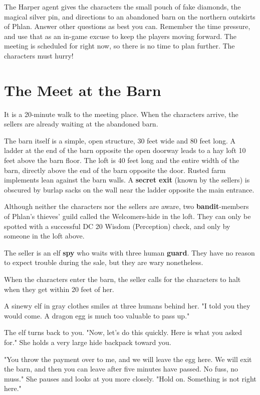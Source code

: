 \documentclass[10pt,a4paper,twoside,bg=print,twocolumn,openany,nodeprecatedcode]{dndbook}
\begin{document}
The Harper agent gives the characters the small pouch of fake diamonds, the magical silver pin, and directions to an abandoned barn on the northern outskirts of Phlan. Answer other questions as best you can. Remember the time pressure, and use that as an in-game excuse to keep the players moving forward. The meeting is scheduled for right now, so there is no time to plan further. The characters must hurry!

\section{The Meet at the Barn}
It is a 20-minute walk to the meeting place. When the characters arrive, the sellers are already waiting at the abandoned barn.

The barn itself is a simple, open structure, 30 feet wide and 80 feet long. A ladder at the end of the barn opposite the open doorway leads to a hay loft 10 feet above the barn floor. The loft is 40 feet long and the entire width of the barn, directly above the end of the barn opposite the door. Rusted farm implements lean against the barn walls. A \textbf{secret exit} (known by the sellers) is obscured by burlap sacks on the wall near the ladder opposite the main entrance.

Although neither the characters nor the sellers are aware, two \textbf{bandit}-members of Phlan's thieves' guild called the Welcomers-hide in the loft. They can only be spotted with a successful DC 20 Wisdom (Perception) check, and only by someone in the loft above.

The seller is an elf \textbf{spy} who waits with three human \textbf{guard}. They have no reason to expect trouble during the sale, but they are wary nonetheless.

When the characters enter the barn, the seller calls for the characters to halt when they get within 20 feet of her.

\begin{DndReadAloud}{}
A sinewy elf in gray clothes smiles at three humans behind her. "I told you they would come. A dragon egg is much too valuable to pass up."

The elf turns back to you. "Now, let's do this quickly. Here is what you asked for." She holds a very large hide backpack toward you.

"You throw the payment over to me, and we will leave the egg here. We will exit the barn, and then you can leave after five minutes have passed. No fuss, no muss." She pauses and looks at you more closely. "Hold on. Something is not right here."

\end{DndReadAloud}
\end{document}
